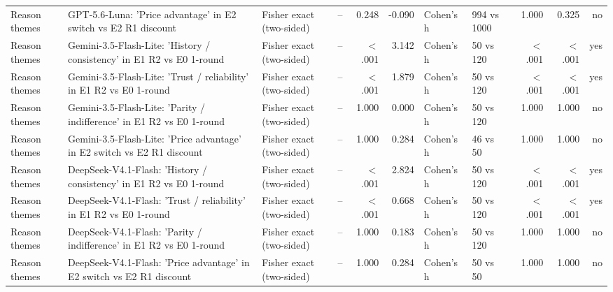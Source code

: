 \begin{table}[htbp]
\begin{tabular}{lllrrrllrrr}
Reason themes & GPT-5.6-Luna: 'Price advantage' in E2 switch vs E2 R1 discount & Fisher exact (two-sided) & -- & 0.248 & -0.090 & Cohen's h & 994 vs 1000 & 1.000 & 0.325 & no \\
Reason themes & Gemini-3.5-Flash-Lite: 'History / consistency' in E1 R2 vs E0 1-round & Fisher exact (two-sided) & -- & $<$.001 & 3.142 & Cohen's h & 50 vs 120 & $<$.001 & $<$.001 & yes \\
Reason themes & Gemini-3.5-Flash-Lite: 'Trust / reliability' in E1 R2 vs E0 1-round & Fisher exact (two-sided) & -- & $<$.001 & 1.879 & Cohen's h & 50 vs 120 & $<$.001 & $<$.001 & yes \\
Reason themes & Gemini-3.5-Flash-Lite: 'Parity / indifference' in E1 R2 vs E0 1-round & Fisher exact (two-sided) & -- & 1.000 & 0.000 & Cohen's h & 50 vs 120 & 1.000 & 1.000 & no \\
Reason themes & Gemini-3.5-Flash-Lite: 'Price advantage' in E2 switch vs E2 R1 discount & Fisher exact (two-sided) & -- & 1.000 & 0.284 & Cohen's h & 46 vs 50 & 1.000 & 1.000 & no \\
Reason themes & DeepSeek-V4.1-Flash: 'History / consistency' in E1 R2 vs E0 1-round & Fisher exact (two-sided) & -- & $<$.001 & 2.824 & Cohen's h & 50 vs 120 & $<$.001 & $<$.001 & yes \\
Reason themes & DeepSeek-V4.1-Flash: 'Trust / reliability' in E1 R2 vs E0 1-round & Fisher exact (two-sided) & -- & $<$.001 & 0.668 & Cohen's h & 50 vs 120 & $<$.001 & $<$.001 & yes \\
Reason themes & DeepSeek-V4.1-Flash: 'Parity / indifference' in E1 R2 vs E0 1-round & Fisher exact (two-sided) & -- & 1.000 & 0.183 & Cohen's h & 50 vs 120 & 1.000 & 1.000 & no \\
Reason themes & DeepSeek-V4.1-Flash: 'Price advantage' in E2 switch vs E2 R1 discount & Fisher exact (two-sided) & -- & 1.000 & 0.284 & Cohen's h & 50 vs 50 & 1.000 & 1.000 & no \\
\bottomrule
\end{tabular}
\end{table}